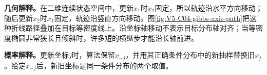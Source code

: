 \documentclass[UTF8,a4paper,11pt,openany]{ctexbook}
\begin{document}
\setcounter{page}{804}
\setcounter{chapter}{33}
\setcounter{figure}{3}
\pagestyle{headings}
\textbf{几何解释。}在二维连续状态空间中，更新$x_1$时$x_2$固定，所以轨迹沿水平方向移动；随后更新$x_2$时$x_1$固定，轨迹沿竖直方向移动。图\ref{fig:V5-C04-gibbs-axis-path}把这种折线路径叠加在目标等密度线上。沿坐标轴移动不表示目标分布轴对齐；当等密度椭圆非常狭长且倾斜时，许多短的横纵步才能沿长轴前进。

\textbf{概率解释。}更新坐标$j$时，算法保留$x_{-j}$，并用其正确条件分布中的新抽样替换旧$x_j$。给定$x_{-j}$后，新旧坐标是同一条件分布的两个取值。
\end{document}

